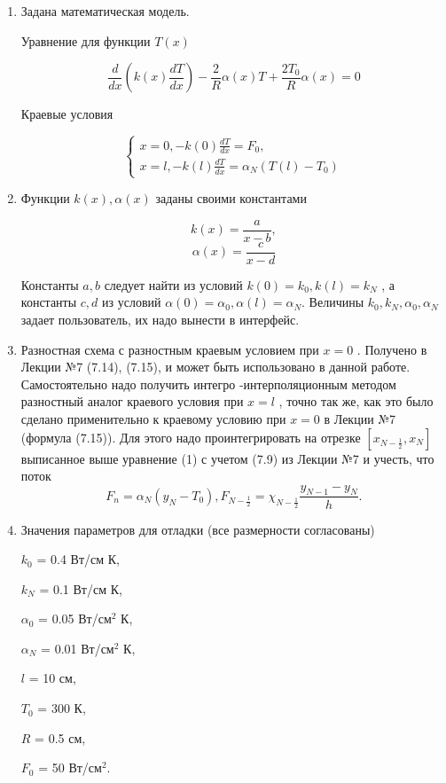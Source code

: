 \documentclass[a4paper,12pt]{article}
\begin{document}
	\begin{enumerate}
		\item Задана математическая модель.
		
		Уравнение для функции $T(x)$
		
		\begin{equation}
		\frac{d}{dx}\left(k(x) \frac{dT}{dx}\right) - \frac{2}{R} \alpha(x)T + \frac{2T_0}{R}\alpha(x) = 0
		\end{equation}
		
		Краевые условия
		
		\[
		\begin{cases}
			x = 0, -k(0)\frac{dT}{dx} = F_0,\\
			
			x = l, -k(l)\frac{dT}{dx} = \alpha_N(T(l) - T_0)
		\end{cases}
		\]
		\item Функции $k(x),\alpha(x)$ заданы своими константами
		
		\[
		k(x) = \frac{a}{x - b},
		\]
		\[
		\alpha(x) = \frac{c}{x - d}
		\]
		
		Константы
		$a,b$
		следует найти из условий
		$k(0) = k_0 , k(l) = k_N$
		, а константы
		$c,d$
		из
		условий
		$\alpha(0) = \alpha_0
		, \alpha(l) = \alpha_N $. Величины
		$k_0
		, k_N ,\alpha_0
		,\alpha_N$
		задает пользователь, их надо
		вынести в интерфейс.
		\item Разностная схема с разностным краевым условием при
		$x = 0$
		. Получено в
		Лекции №7 (7.14), (7.15), и может быть использовано в данной работе. Самостоятельно
		надо получить интегро -интерполяционным методом разностный аналог краевого условия
		при
		$x = l$
		, точно так же, как это было сделано применительно к краевому условию при
		$x = 0$
		в Лекции №7 (формула (7.15)). Для этого надо проинтегрировать на отрезке $[x_{N-\frac{1}{2}},
		x_N]$ выписанное выше уравнение (1) с учетом (7.9) из Лекции №7 и учесть, что поток
		\[
		F_n = \alpha_N(y_N-T_0), F_{N-\frac{1}{2}} = \chi_{N-\frac{1}{2}}\frac{y_{N-1}-y_N}{h}.
		\]
		\item Значения параметров для отладки (все размерности согласованы)
		
		$k_0$ = 0.4 Вт/см К,
		
		$k_N$ = 0.1 Вт/см К,
		
		$\alpha_0$ = 0.05 Вт/см$^2$ К,
		
		$\alpha_N$ = 0.01 Вт/см$^2$ К,
		
		$l$ = 10 см,
		
		$T_0$ = 300 К,
		
		$R$ = 0.5 см,
		
		$F_0$ = 50 Вт/см$^2$.
	\end{enumerate}
	
\end{document}
